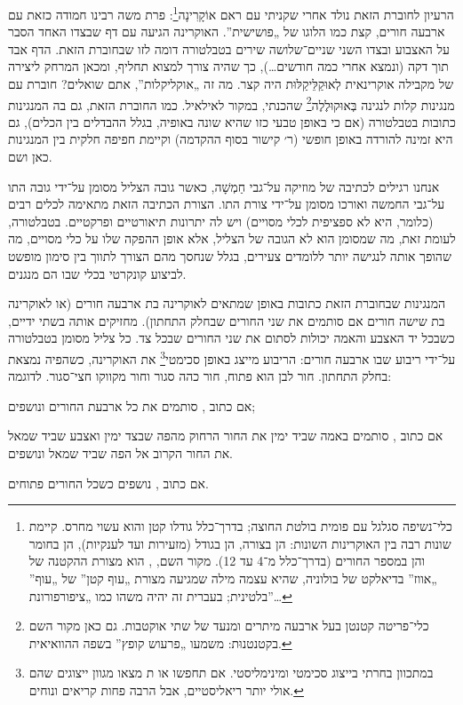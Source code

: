 
הרעיון לחוברת הזאת נולד אחרי שקניתי עם ראם אוֹקָרִינָה\footnote{כלי־נשיפה סגלגל עם פומית בולטת החוצה; בדרך־כלל גודלו קטן והוא עשוי מחרס. קיימת שונות רבה בין האוקרינות השונות: הן בצורה, הן בגודל (מזעירות ועד לענקיות), הן בחומר והן במספר החורים (בדרך־כלל מ־4 עד 12). מקור השם, , הוא מצורת ההקטנה של  „אווז” בדיאלקט של בולוניה, שהיא עצמה מילה שמגיעה מצורת  „עוף קטן” של  „עוף” בלטינית; בעברית זה יהיה משהו כמו „ציפורפורונת”…}: פרת משה רבינו חמודה כזאת עם ארבעה חורים, קצת כמו הלוגו של „פושישית”. האוקרינה הגיעה עם דף שבצדו האחד הסבר על האצבוע ובצדו השני שניים־שלושה שירים בטבלטורה דומה לזו שבחוברת הזאת. הדף אבד תוך דקה (ונמצא אחרי כמה חודשים…), כך שהיה צורך למצוא תחליף, ומכאן המרחק ליצירה של מקבילה אוקרינאית לְאוּקַלֵּיקַלּוּת היה קצר. מה זה „אוקליקלות”, אתם שואלים? חוברת עם מנגינות קלות לנגינה בְּאוּקוּלֶלֶה\footnote{כלי־פריטה קטנטן בעל ארבעה מיתרים ומנעד של שתי אוקטבות. גם כאן מקור השם בקטנטנוּת:  משמעו „פרעוש קופץ” בשפה ההוואיאית.} שהכנתי, במקור לאילאיל. כמו החוברת הזאת, גם בה המנגינות כתובות בטבלטורה (אם כי באופן טבעי כזו שהיא שונה באופיה, בגלל ההבדלים בין הכלים), גם היא זמינה להורדה באופן חופשי (ר׳ קישור בסוף ההקדמה) וקיימת חפיפה חלקית בין המנגינות כאן ושם.




אנחנו רגילים לכתיבה של מוזיקה על־גבי חַמְשָׁה, כאשר גובה הצליל מסומן על־ידי גובה התו על־גבי החמשה ואורכו מסומן על־ידי צורת התו. הצורת הכתיבה הזאת מתאימה לכלים רבים (כלומר, היא לא ספציפית לכלי מסויים) ויש לה יתרונות תיאורטיים ופרקטיים. בטבלטורה, לעומת זאת, מה שמסומן הוא לא הגובה של הצליל, אלא אופן ההפקה שלו על כלי מסויים, מה שהופך אותה לנגישה יותר ללומדים צעירים, בגלל שנחסך מהם הצורך לתווך בין סימון מופשט לביצוע קונקרטי בכלי שבו הם מנגנים.

המנגינות שבחוברת הזאת כתובות באופן שמתאים לאוקרינה בת ארבעה חורים (או לאוקרינה בת שישה חורים אם סותמים את שני החורים שבחלק התחתון). מחזיקים אותה בשתי ידיים, כשבכל יד האצבע והאמה יכולות לסתום את שני החורים שבכל צד. כל צליל מסומן בטבלטורה על־ידי ריבוע שבו ארבעה חורים: הריבוע מייצג באופן סכימטי\footnote{במתכוון בחרתי בייצוג סכימטי ומינימליסטי. אם תחפשו  או  ת מצאו מגוון ייצוגים שהם אולי יותר ריאליסטיים, אבל הרבה פחות קריאים ונוחים.} את האוקרינה, כשהפיה נמצאת בחלק התחתון. חור לבן הוא פתוח, חור כהה סגור וחור מקווקו חצי־סגור. לדוגמה:
\begin{compactitem}
	\item אם כתוב \enliniatabulaturo{\c}, סותמים את כל ארבעת החורים ונושפים;
	\item אם כתוב \enliniatabulaturo{\gis}, סותמים באמה שביד ימין את החור הרחוק מהפה שבצד ימין ואצבע שביד שמאל את החור הקרוב אל הפה שביד שמאל ונושפים.
	\item אם כתוב \enliniatabulaturo{\C}, נושפים כשכל החורים פתוחים.
\end{compactitem}

